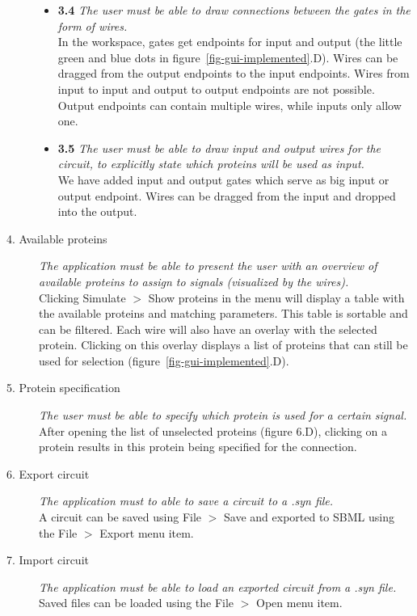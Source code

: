 \documentclass[a4paper]{article}
\begin{document}
\begin{description}
\begin{itemize}
	\item \textbf{3.4} \textit{The user must be able to draw connections between the gates in the form of wires.}\\
	In the workspace, gates get endpoints for input and output (the little green and blue dots in figure~\ref{fig-gui-implemented}.D). Wires can be dragged from the output endpoints to the input endpoints. Wires from input to input and output to output endpoints are not possible. Output endpoints can contain multiple wires, while inputs only allow one.

	\item \textbf{3.5} \textit{The user must be able to draw input and output wires for the circuit, to explicitly state which proteins will be used as input.}\\
	We have added input and output gates which serve as big input or output endpoint. Wires can be dragged from the input and dropped into the output.
\end{itemize}

\item[4. Available proteins] \textit{The application must be able to present the user with an overview of available proteins to assign to signals (visualized by the wires).}\\
Clicking Simulate $>$ Show proteins in the menu will display a table with the available proteins and matching parameters. This table is sortable and can be filtered. Each wire will also have an overlay with the selected protein. Clicking on this overlay displays a list of proteins that can still be used for selection (figure~\ref{fig-gui-implemented}.D).

\item[5. Protein specification] \textit{The user must be able to specify which protein is used for a certain signal.}\\
After opening the list of unselected proteins (figure 6.D), clicking on a protein results in this protein being specified for the connection.

\item[6. Export circuit] \textit{The application must to able to save a circuit to a .syn file.}\\
A circuit can be saved using File $>$ Save and exported to SBML using the File $>$ Export menu item.

\item[7. Import circuit] \textit{The application must be able to load an exported circuit from a .syn file.}\\
Saved files can be loaded using the File $>$ Open menu item.


\end{description}
\end{document}
